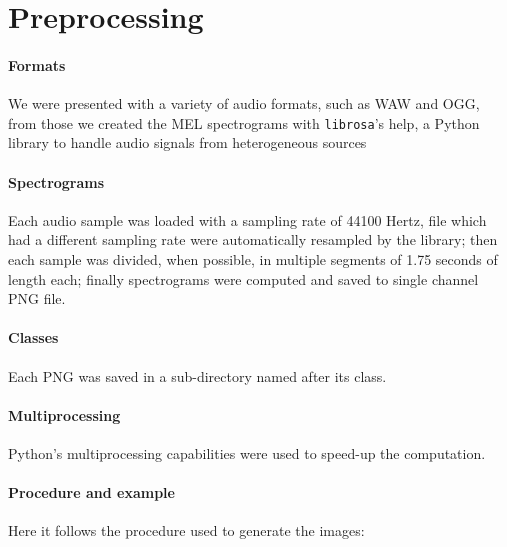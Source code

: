 \section{Preprocessing}

\paragraph{Formats}
We were presented with a variety of audio formats, such as WAW and OGG, from those we created the MEL spectrograms with \texttt{librosa}'s help, a Python library to handle audio signals from heterogeneous sources

\paragraph{Spectrograms}
Each audio sample was loaded with a sampling rate of 44100 Hertz, file which had a different sampling rate were automatically resampled by the library; then each sample was divided, when possible, in multiple segments of 1.75 seconds of length each; finally spectrograms were computed and saved to single channel PNG file.

\paragraph{Classes}
Each PNG was saved in a sub-directory named after its class.

\paragraph{Multiprocessing}
Python's multiprocessing capabilities were used to speed-up the computation.

\paragraph{Procedure and example}
Here it follows the procedure used to generate the images:



